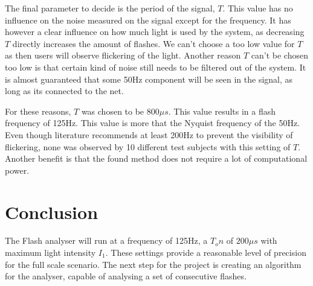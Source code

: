 The final parameter to decide is the period of the signal, $T$. This value has no influence on the noise measured on the signal except for the frequency. It has however a clear influence on how much light is used by the system, as decreasing $T$ directly increases the amount of flashes. We can't choose a too low value for $T$ as then users will observe flickering of the light. Another reason $T$ can't be chosen too low is that certain kind of noise still needs to be filtered out of the system. It is almost guaranteed that some 50Hz component will be seen in the signal, as long as its connected to the net. 

For these reasons, $T$ was chosen to be 800$\mu s$. This value results in a flash frequency of 125Hz. This value is more that the Nyquist frequency of the 50Hz. Even though literature recommends at least 200Hz to prevent the visibility of flickering, none was observed by 10 different test subjects with this setting of $T$. Another benefit is that the found method does not require a lot of computational power.

\section{Conclusion}
The Flash analyser will run at a frequency of 125Hz, a $T_on$ of $200\mu s$ with maximum light intensity $I_1$. These settings provide a reasonable level of precision for the full scale scenario. The next step for the project is creating an algorithm for the analyser, capable of analysing a set of consecutive flashes.